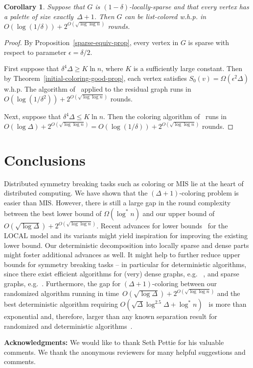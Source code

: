 \documentclass[11pt]{amsart}
\newtheorem{corollary}[theorem]{Corollary}
\begin{document}
\begin{corollary}
Suppose that $G$ is $(1-\delta)$-locally-sparse and that every vertex has a palette of size exactly~$\Delta+1$. Then $G$ can be list-colored w.h.p. in $O( \log(1/\delta)) + 2^{O(\sqrt{\log \log n})}$ rounds.
\end{corollary}
\begin{proof}
By Proposition~\ref{sparse-equiv-prop}, every vertex in $G$ is sparse with respect to parameter $\epsilon = \delta/2$. 

First suppose that $\delta^4 \Delta \geq K \ln n$, where $K$ is a sufficiently large constant. Then by Theorem~\ref{initial-coloring-good-prop}, each vertex satisfies $S_0(v) = \Omega(\epsilon^2 \Delta)$ w.h.p. The algorithm of~\cite{elk15} applied to the residual graph runs in $O(\log(1/\delta^2)) + 2^{O(\sqrt{\log \log n})}$ rounds.

Next, suppose that $\delta^4 \Delta \leq K \ln n$. Then the coloring algorithm of~\cite{BEPS16} runs in $O(\log \Delta) + 2^{O(\sqrt{\log \log n})} = O(\log(1/\delta)) + 2^{O(\sqrt{\log \log n})}$ rounds.
\end{proof}

\section{Conclusions}
Distributed symmetry breaking tasks such as coloring or MIS lie at the heart of distributed computing. We have shown that the $(\Delta+1)$-coloring problem is easier than MIS. However, there is still a large gap in the round complexity between the best lower bound of $\Omega(\log^* n)$ and our upper bound of $O(\sqrt{\log \Delta})+ 2^{O(\sqrt{\log \log n})}$. Recent advances for lower bounds~\cite{Brandt16, ChangP17, hef16, chlpj17} for the \textsf{LOCAL} model and its variants might yield inspiration for improving the existing lower bound. Our deterministic decomposition into locally sparse and dense parts might foster additional advances as well. It might help to further reduce upper bounds for symmetry breaking tasks -- in particular for deterministic algorithms, since there exist efficient algorithms for (very) dense graphs, e.g. ~\cite{sch10opt}, and sparse graphs, e.g.~\cite{moh17}. Furthermore, the gap for $(\Delta+1)$-coloring between our randomized algorithm running in time~$O(\sqrt{\log \Delta})+ 2^{O(\sqrt{\log \log n})}$ and the best deterministic algorithm requiring $O(\sqrt{\Delta}\log^{2.5}\Delta + \log^{*} n)$~\cite{FraigniaudHK15} is more than exponential and, therefore, larger than any known separation result for randomized and deterministic algorithms~\cite{chan16}.

\medskip
\noindent \textbf{Acknowledgments:} We would like to thank Seth Pettie for his valuable comments. We thank the anonymous reviewers for many helpful suggestions and comments.



\end{document}
